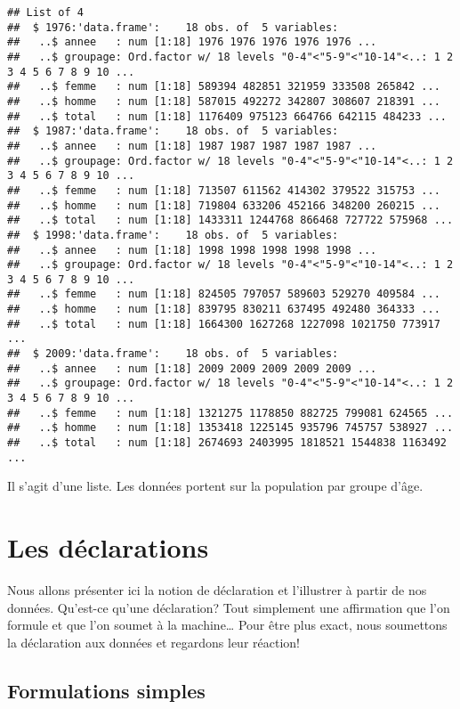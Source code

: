 \documentclass[]{book}
\begin{document}
\begin{verbatim}
## List of 4
##  $ 1976:'data.frame':    18 obs. of  5 variables:
##   ..$ annee   : num [1:18] 1976 1976 1976 1976 1976 ...
##   ..$ groupage: Ord.factor w/ 18 levels "0-4"<"5-9"<"10-14"<..: 1 2 3 4 5 6 7 8 9 10 ...
##   ..$ femme   : num [1:18] 589394 482851 321959 333508 265842 ...
##   ..$ homme   : num [1:18] 587015 492272 342807 308607 218391 ...
##   ..$ total   : num [1:18] 1176409 975123 664766 642115 484233 ...
##  $ 1987:'data.frame':    18 obs. of  5 variables:
##   ..$ annee   : num [1:18] 1987 1987 1987 1987 1987 ...
##   ..$ groupage: Ord.factor w/ 18 levels "0-4"<"5-9"<"10-14"<..: 1 2 3 4 5 6 7 8 9 10 ...
##   ..$ femme   : num [1:18] 713507 611562 414302 379522 315753 ...
##   ..$ homme   : num [1:18] 719804 633206 452166 348200 260215 ...
##   ..$ total   : num [1:18] 1433311 1244768 866468 727722 575968 ...
##  $ 1998:'data.frame':    18 obs. of  5 variables:
##   ..$ annee   : num [1:18] 1998 1998 1998 1998 1998 ...
##   ..$ groupage: Ord.factor w/ 18 levels "0-4"<"5-9"<"10-14"<..: 1 2 3 4 5 6 7 8 9 10 ...
##   ..$ femme   : num [1:18] 824505 797057 589603 529270 409584 ...
##   ..$ homme   : num [1:18] 839795 830211 637495 492480 364333 ...
##   ..$ total   : num [1:18] 1664300 1627268 1227098 1021750 773917 ...
##  $ 2009:'data.frame':    18 obs. of  5 variables:
##   ..$ annee   : num [1:18] 2009 2009 2009 2009 2009 ...
##   ..$ groupage: Ord.factor w/ 18 levels "0-4"<"5-9"<"10-14"<..: 1 2 3 4 5 6 7 8 9 10 ...
##   ..$ femme   : num [1:18] 1321275 1178850 882725 799081 624565 ...
##   ..$ homme   : num [1:18] 1353418 1225145 935796 745757 538927 ...
##   ..$ total   : num [1:18] 2674693 2403995 1818521 1544838 1163492 ...
\end{verbatim}

Il s'agit d'une liste. Les données portent sur la population par groupe
d'âge.

\section{Les déclarations}\label{les-declarations}

Nous allons présenter ici la notion de déclaration et l'illustrer à
partir de nos données. Qu'est-ce qu'une déclaration? Tout simplement une
affirmation que l'on formule et que l'on soumet à la machine\ldots{}
Pour être plus exact, nous soumettons la déclaration aux données et
regardons leur réaction!

\subsection{Formulations simples}\label{formulations-simples}
\end{document}
